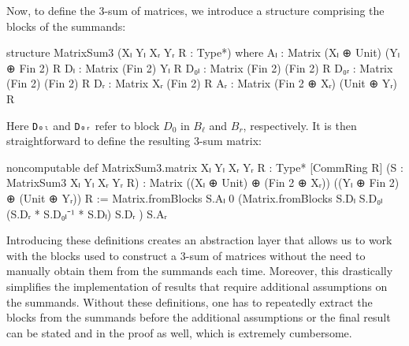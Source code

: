 Now, to define the 3-sum of matrices, we introduce a structure comprising the blocks of the summands:
\begin{leancode}
structure MatrixSum3 (Xₗ Yₗ Xᵣ Yᵣ R : Type*) where
  Aₗ : Matrix (Xₗ ⊕ Unit) (Yₗ ⊕ Fin 2) R
  Dₗ : Matrix (Fin 2) Yₗ R
  D₀ₗ : Matrix (Fin 2) (Fin 2) R
  D₀ᵣ : Matrix (Fin 2) (Fin 2) R
  Dᵣ : Matrix Xᵣ (Fin 2) R
  Aᵣ : Matrix (Fin 2 ⊕ Xᵣ) (Unit ⊕ Yᵣ) R
\end{leancode}
Here \texttt{D₀ₗ} and \texttt{D₀ᵣ} refer to block $D_{0}$ in $B_{\ell}$ and $B_{r}$, respectively.
It is then straightforward to define the resulting 3-sum matrix:
\begin{leancode}
noncomputable def MatrixSum3.matrix
    {Xₗ Yₗ Xᵣ Yᵣ R : Type*} [CommRing R]
    (S : MatrixSum3 Xₗ Yₗ Xᵣ Yᵣ R) :
    Matrix
      ((Xₗ ⊕ Unit) ⊕ (Fin 2 ⊕ Xᵣ))
      ((Yₗ ⊕ Fin 2) ⊕ (Unit ⊕ Yᵣ))
      R :=
  Matrix.fromBlocks S.Aₗ 0
    (Matrix.fromBlocks S.Dₗ S.D₀ₗ
      (S.Dᵣ * S.D₀ₗ⁻¹ * S.Dₗ) S.Dᵣ
    ) S.Aᵣ
\end{leancode}
Introducing these definitions creates an abstraction layer that allows us to work with the blocks used to construct a 3-sum of matrices without the need to manually obtain them from the summands each time. Moreover, this drastically simplifies the implementation of results that require additional assumptions on the summands. Without these definitions, one has to repeatedly extract the blocks from the summands before the additional assumptions or the final result can be stated and in the proof as well, which is extremely cumbersome.

